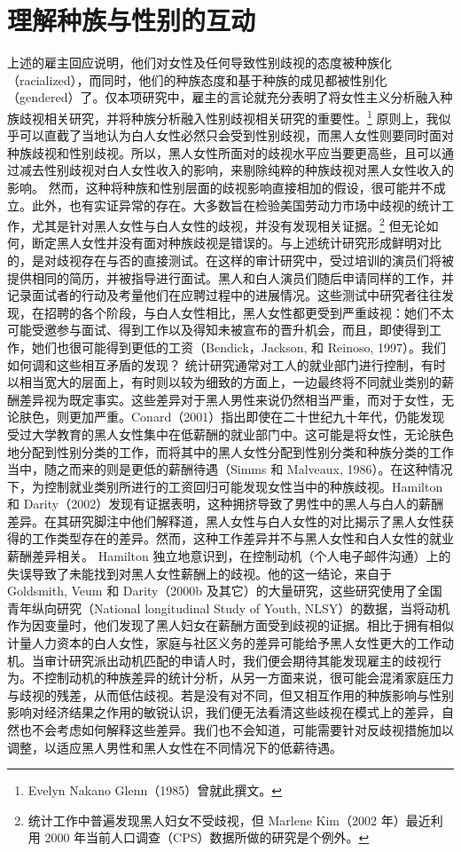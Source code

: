 \documentclass[UTF8]{ctexart}
\begin{document}
\section{理解种族与性别的互动}上述的雇主回应说明，他们对女性及任何导致性别歧视的态度被种族化（racialized），而同时，他们的种族态度和基于种族的成见都被性别化（gendered）了。仅本项研究中，雇主的言论就充分表明了将女性主义分析融入种族歧视相关研究，并将种族分析融入性别歧视相关研究的重要性。\footnote[9]{Evelyn Nakano Glenn（1985）曾就此撰文。}
原则上，我似乎可以直截了当地认为白人女性必然只会受到性别歧视，而黑人女性则要同时面对种族歧视和性别歧视。所以，黑人女性所面对的歧视水平应当要更高些，且可以通过减去性别歧视对白人女性收入的影响，来剔除纯粹的种族歧视对黑人女性收入的影响。
然而，这种将种族和性别层面的歧视影响直接相加的假设，很可能并不成立。此外，也有实证异常的存在。大多数旨在检验美国劳动力市场中歧视的统计工作，尤其是针对黑人女性与白人女性的歧视，并没有发现相关证据。\footnote[10]{统计工作中普遍发现黑人妇女不受歧视，但 Marlene Kim（2002 年）最近利用 2000 年当前人口调查（CPS）数据所做的研究是个例外。}
但无论如何，断定黑人女性并没有面对种族歧视是错误的。与上述统计研究形成鲜明对比的，是对歧视存在与否的直接测试。在这样的审计研究中，受过培训的演员们将被提供相同的简历，并被指导进行面试。黑人和白人演员们随后申请同样的工作，并记录面试者的行动及考量他们在应聘过程中的进展情况。这些测试中研究者往往发现，在招聘的各个阶段，与白人女性相比，黑人女性都更受到严重歧视：她们不太可能受邀参与面试、得到工作以及得知未被宣布的晋升机会，而且，即使得到工作，她们也很可能得到更低的工资（Bendick，Jackson, 和 Reinoso, 1997）。我们如何调和这些相互矛盾的发现？
统计研究通常对工人的就业部门进行控制，有时以相当宽大的层面上，有时则以较为细致的方面上，一边最终将不同就业类别的薪酬差异视为既定事实。这些差异对于黑人男性来说仍然相当严重，而对于女性，无论肤色，则更加严重。Conard（2001）指出即使在二十世纪九十年代，仍能发现受过大学教育的黑人女性集中在低薪酬的就业部门中。这可能是将女性，无论肤色地分配到性别分类的工作，而将其中的黑人女性分配到性别分类和种族分类的工作当中，随之而来的则是更低的薪酬待遇（Simms 和 Malveaux, 1986）。在这种情况下，为控制就业类别所进行的工资回归可能发现女性当中的种族歧视。Hamilton 和 Darity（2002）发现有证据表明，这种拥挤导致了男性中的黑人与白人的薪酬差异。在其研究脚注中他们解释道，黑人女性与白人女性的对比揭示了黑人女性获得的工作类型存在的差异。然而，这种工作差异并不与黑人女性和白人女性的就业薪酬差异相关。
Hamilton 独立地意识到，在控制动机（个人电子邮件沟通）上的失误导致了未能找到对黑人女性薪酬上的歧视。他的这一结论，来自于 Goldsmith, Veum 和 Darity（2000b 及其它）的大量研究，这些研究使用了全国青年纵向研究（National longitudinal Study of Youth, NLSY）的数据，当将动机作为因变量时，他们发现了黑人妇女在薪酬方面受到歧视的证据。相比于拥有相似计量人力资本的白人女性，家庭与社区义务的差异可能给予黑人女性更大的工作动机。当审计研究派出动机匹配的申请人时，我们便会期待其能发现雇主的歧视行为。不控制动机的种族差异的统计分析，从另一方面来说，很可能会混淆家庭压力与歧视的残差，从而低估歧视。若是没有对不同，但又相互作用的种族影响与性别影响对经济结果之作用的敏锐认识，我们便无法看清这些歧视在模式上的差异，自然也不会考虑如何解释这些差异。我们也不会知道，可能需要针对反歧视措施加以调整，以适应黑人男性和黑人女性在不同情况下的低薪待遇。
\end{document}

